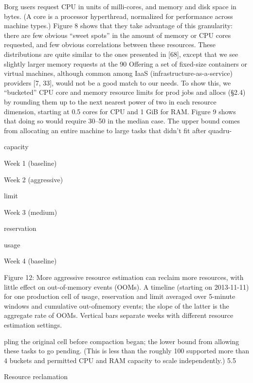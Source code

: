 Borg users request CPU in units of milli-cores, and memory
and disk space in bytes. (A core is a processor hyperthread,
normalized for performance across machine types.) Figure 8
shows that they take advantage of this granularity: there are
few obvious “sweet spots” in the amount of memory or CPU
cores requested, and few obvious correlations between these
resources. These distributions are quite similar to the ones
presented in [68], except that we see slightly larger memory
requests at the 90%
Offering a set of fixed-size containers or virtual machines,
although common among IaaS (infrastructure-as-a-service)
providers [7, 33], would not be a good match to our needs.
To show this, we “bucketed” CPU core and memory resource
limits for prod jobs and allocs (§2.4) by rounding them up to
the next nearest power of two in each resource dimension,
starting at 0.5 cores for CPU and 1 GiB for RAM. Figure 9
shows that doing so would require 30–50%
in the median case. The upper bound comes from allocating
an entire machine to large tasks that didn’t fit after quadru-


capacity

Week 1 (baseline)

Week 2 (aggressive)

limit

Week 3 (medium)

reservation

usage

Week 4 (baseline)

Figure 12: More aggressive resource estimation can reclaim more resources, with little effect on out-of-memory events (OOMs). A timeline
(starting on 2013-11-11) for one production cell of usage, reservation and limit averaged over 5-minute windows and cumulative out-ofmemory events; the slope of the latter is the aggregate rate of OOMs. Vertical bars separate weeks with different resource estimation settings.

pling the original cell before compaction began; the lower
bound from allowing these tasks to go pending. (This is less
than the roughly 100%
supported more than 4 buckets and permitted CPU and RAM
capacity to scale independently.)
5.5

Resource reclamation

